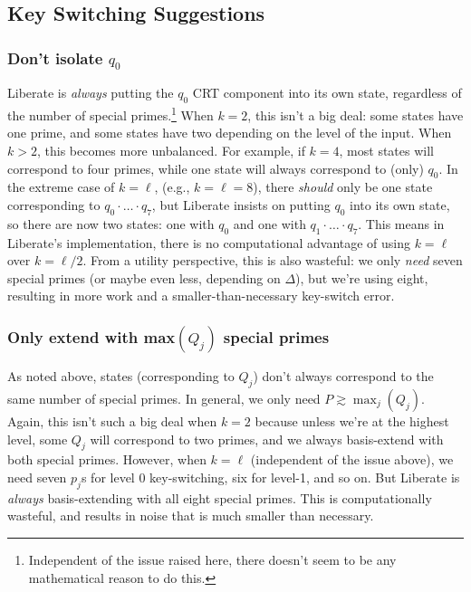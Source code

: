 \documentclass[../keyswitching.tex]{subfiles}
\begin{document}
\subsection{Key Switching Suggestions}
\label{sec:liberatesuggestsion}
\subsubsection{Don't isolate $q_0$}
Liberate is \emph{always} putting the $q_0$ CRT component into its own state, regardless of the number of special primes.\footnote{Independent of the issue raised here, there doesn't seem to be any mathematical reason to do this.} When $k=2$, this isn't a big deal: some states have one prime, and some states have two depending on the level of the input. When $k>2$, this becomes more unbalanced. For example, if $k=4$, most states will correspond to four primes, while one state will always correspond to (only) $q_0$. In the extreme case of $k=\ell$, (e.g., $k=\ell=8$), there \emph{should} only be one state corresponding to $q_0\cdot\ldots\cdot q_7$, but Liberate insists on putting $q_0$ into its own state, so there are now two states: one with $q_0$ and one with $q_1\cdot\ldots\cdot q_7$. This means in Liberate's implementation, there is no computational advantage of using $k=\ell$ over $k=\ell/2$. From a utility perspective, this is also wasteful: we only \emph{need} seven special primes (or maybe even less, depending on $\Delta$), but we're using eight, resulting in more work and a smaller-than-necessary key-switch error.

\subsubsection{Only extend with max$(Q_j)$ special primes}
As noted above, states (corresponding to $Q_j$) don't always correspond to the same number of special primes. In general, we only need $P\gtrsim \max_j(Q_j)$. Again, this isn't such a big deal when $k=2$ because unless we're at the highest level, some $Q_j$ will correspond to two primes, and we always basis-extend with both special primes. However, when $k=\ell$ (independent of the issue above), we need seven $p_j$s for level 0 key-switching, six for level-1, and so on. But Liberate is \emph{always} basis-extending with all eight special primes. This is computationally wasteful, and results in noise that is much smaller than necessary.

\ifcompileasbook
\else
\printbibliography
\fi
\end{document}
